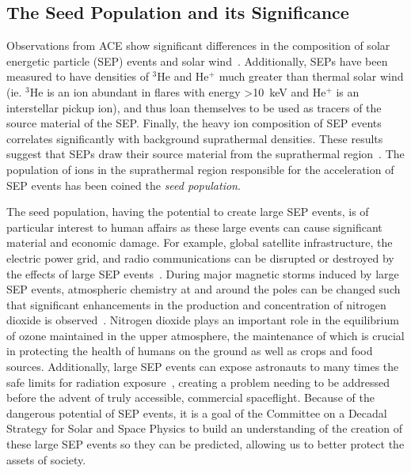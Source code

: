 \documentclass[letterpaper,11pt]{article}
\begin{document}

\subsection{The Seed Population and its Significance}
Observations from ACE show significant differences in the composition of solar energetic particle (SEP) events and solar wind~\citep{Mewaldt2012}.  Additionally, SEPs have been measured to have densities of ${}^3$He and He${}^+$ much greater than thermal solar wind (ie. ${}^3$He is an ion abundant in flares with energy \SI{>10}{\kilo\electronvolt} and He${}^+$ is an interstellar pickup ion), and thus loan themselves to be used as tracers of the source material of the SEP.  Finally, the heavy ion composition of SEP events correlates significantly with background suprathermal densities.  These results suggest that SEPs draw their source material from the suprathermal region~\citep{Desai2006}.  The population of ions in the suprathermal region responsible for the acceleration of SEP events has been coined the \textit{seed population}.

The seed population, having the potential to create large SEP events, is of particular interest to human affairs as these large events can cause significant material and economic damage.  For example, global satellite infrastructure, the electric power grid, and radio communications can be disrupted or destroyed by the effects of large SEP events~\citep{Decadal2013,Desai2016}.  During major magnetic storms induced by large SEP events, atmospheric chemistry at and around the poles can be changed such that significant enhancements in the production and concentration of nitrogen dioxide is observed~\citep{Decadal2013}.  Nitrogen dioxide plays an important role in the equilibrium of ozone maintained in the upper atmosphere, the maintenance of which is crucial in protecting the health of humans on the ground as well as crops and food sources.  Additionally, large SEP events can expose astronauts to many times the safe limits for radiation exposure~\citep{Decadal2013}, creating a problem needing to be addressed before the advent of truly accessible, commercial spaceflight.  Because of the dangerous potential of SEP events, it is a goal of the Committee on a Decadal Strategy for Solar and Space Physics to build an understanding of the creation of these large SEP events so they can be predicted, allowing us to better protect the assets of society.
\end{document}
